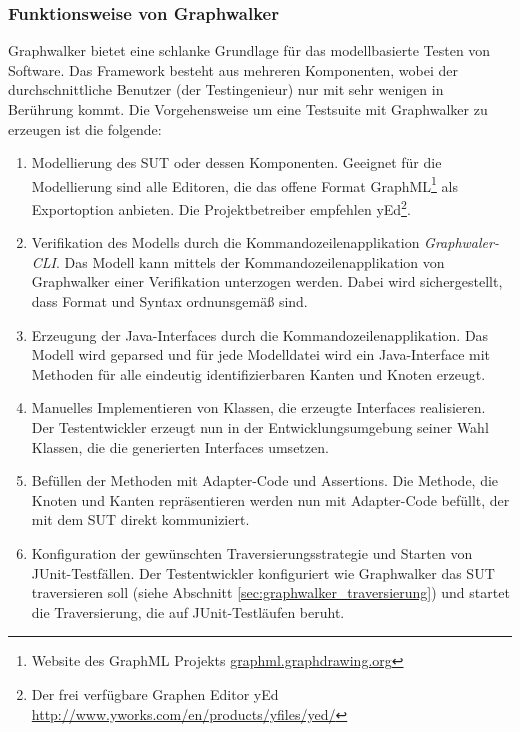 \subsubsection{Funktionsweise von Graphwalker}
\label{sec:graphwalker_funktionsweise}
Graphwalker bietet eine schlanke Grundlage für das modellbasierte Testen von Software. Das Framework besteht aus mehreren Komponenten, wobei der durchschnittliche Benutzer (der Testingenieur) nur mit sehr wenigen in Berührung kommt. Die Vorgehensweise um eine Testsuite mit Graphwalker zu erzeugen ist die folgende:

\begin{enumerate}
\item Modellierung des \Gls{SUT} oder dessen Komponenten. Geeignet für die Modellierung sind alle Editoren, die das offene Format GraphML\footnote{Website des GraphML Projekts \url{graphml.graphdrawing.org}} als Exportoption anbieten. Die Projektbetreiber empfehlen yEd\footnote{Der frei verfügbare Graphen Editor yEd \url{http://www.yworks.com/en/products/yfiles/yed/}}.
\item Verifikation des Modells durch die Kommandozeilenapplikation \textit{Graphwaler-CLI}. Das Modell kann mittels der Kommandozeilenapplikation von Graphwalker einer Verifikation unterzogen werden. Dabei wird sichergestellt, dass Format und Syntax ordnunsgemäß sind.
\item Erzeugung der Java-Interfaces durch die Kommandozeilenapplikation. Das Modell wird geparsed und für jede Modelldatei wird ein Java-Interface mit Methoden für alle eindeutig identifizierbaren Kanten und Knoten erzeugt.
\item Manuelles Implementieren von Klassen, die erzeugte Interfaces realisieren. Der Testentwickler erzeugt nun in der Entwicklungsumgebung seiner Wahl Klassen, die die generierten Interfaces umsetzen.
\item Befüllen der Methoden mit Adapter-Code und Assertions. Die Methode, die Knoten und Kanten repräsentieren werden nun mit Adapter-Code befüllt, der mit dem \Gls{SUT} direkt kommuniziert.
\item Konfiguration der gewünschten Traversierungsstrategie und Starten von JUnit-Testfällen. Der Testentwickler konfiguriert wie Graphwalker das \Gls{SUT} traversieren soll (siehe Abschnitt \ref{sec:graphwalker_traversierung}) und startet die Traversierung, die auf JUnit-Testläufen beruht.
\end{enumerate}


